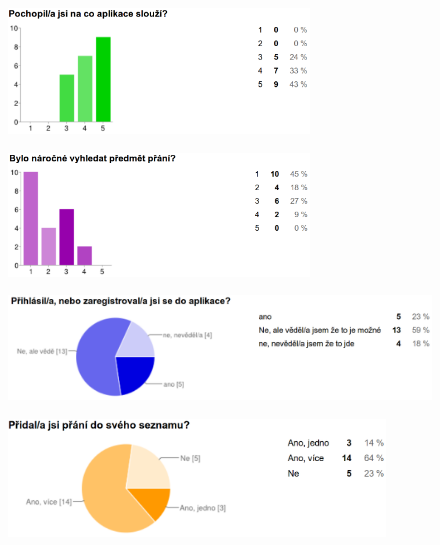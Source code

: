 \begin{figure}[H]
\begin{center}
\includegraphics[width=80mm]{./pictures/dotaznik/pokrocily-01.png}
\label{fig:dot:pokrocily-01}
\end{center}
\end{figure}

\begin{figure}[H]
\begin{center}
\includegraphics[width=80mm]{./pictures/dotaznik/pokrocily-02.png}
\label{fig:dot:pokrocily-02}
\end{center}
\end{figure}

\begin{figure}[H]
\begin{center}
\includegraphics[width=120mm]{./pictures/dotaznik/pokrocily-03.png}
\label{fig:dot:pokrocily-03}
\end{center}
\end{figure}

\begin{figure}[H]
\begin{center}
\includegraphics[width=100mm]{./pictures/dotaznik/pokrocily-04.png}
\label{fig:dot:pokrocily-04}
\end{center}
\end{figure}



